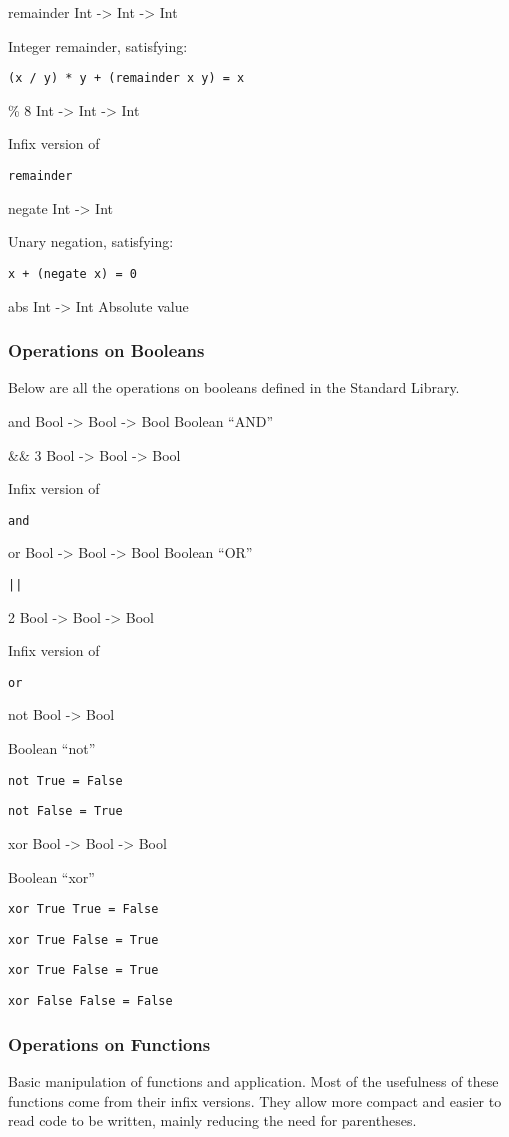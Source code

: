 \documentclass{article}
\def\code#1{\begin{footnotesize}\texttt{#1}\end{footnotesize}}
\begin{document}
\medskip

\libfunction
  {remainder}
  {Int -> Int -> Int}
  {Integer remainder, satisfying:

  \code{(x / y) * y + (remainder x y) = x}}

\liboperator
  {\%}
  {\leftassociative}
  {8}
  {Int -> Int -> Int}
  {Infix version of \code{remainder}}

\libfunction
  {negate}
  {Int -> Int}
  {Unary negation, satisfying:

  \code{x + (negate x) = 0}}

\libfunction
  {abs}
  {Int -> Int}
  {Absolute value}

\subsubsection{Operations on Booleans}

Below are all the operations on booleans defined in the Standard Library.

\medskip

\libfunction
  {and}
  {Bool -> Bool -> Bool}
  {Boolean ``AND''}

\liboperator
  {\&\&}
  {\rightassociative}
  {3}
  {Bool -> Bool -> Bool}
  {Infix version of \code{and}}

\libfunction
  {or}
  {Bool -> Bool -> Bool}
  {Boolean ``OR''}

\liboperator
  {\code{||}}
  {\rightassociative}
  {2}
  {Bool -> Bool -> Bool}
  {Infix version of \code{or}}

\libfunction
  {not}
  {Bool -> Bool}
  {Boolean ``not''

  \code{not True = False}

  \code{not False = True}}

\libfunction
  {xor}
  {Bool -> Bool -> Bool}
  {Boolean ``xor''

  \code{xor True  True  = False}

  \code{xor True  False = True}

  \code{xor True  False = True}

  \code{xor False False = False}}

\subsubsection{Operations on Functions}

Basic manipulation of functions and application.
Most of the usefulness of these functions come from their infix versions.
They allow more compact and easier to read code to be written, mainly reducing the need for parentheses.
\end{document}
